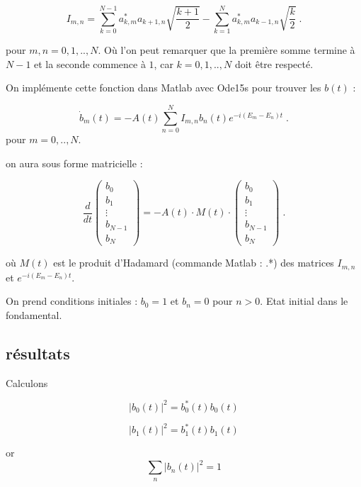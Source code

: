 \documentclass{report}
\begin{document}
\begin{equation}
I_{m,n} = \sum_{k=0}^{N-1} a_{k,m}^{\ast}  a_{k+1,n} \sqrt{\frac{k+1}{2}}- \sum_{k=1}^{N} a_{k,m}^{\ast}a_{k-1,n}\sqrt{\frac{k}{2}}\;.
\end{equation}

pour $m,n = 0,1,..,N$. Où l'on peut remarquer que la première somme termine à $N-1$ et la seconde commence à $1$, car $k =0,1,..,N$ doit être respecté.




On implémente cette fonction dans Matlab avec Ode15s pour trouver les $b(t)$ :

\begin{equation}
\dot{b}_{m}(t) = - A(t) \sum_{n=0}^{N}I_{m,n}b_{n}(t) e^{-i(E_{m}-E_{n})t}\;.
\end{equation}
pour $m=0,..,N$.

on aura sous forme matricielle :

\begin{equation}
\frac{d}{dt}
\begin{pmatrix}
 b_{0}\\ 
 b_{1}\\ 
 \vdots\\ 
 b_{N-1}\\ 
  b_{N}
\end{pmatrix} = -A(t) \cdot M(t) \cdot 
\begin{pmatrix}
 b_{0}\\ 
 b_{1}\\ 
 \vdots\\ 
 b_{N-1}\\ 
  b_{N}
\end{pmatrix}\;.
\end{equation}

où $M(t)$ est le produit d'Hadamard (commande Matlab : .*) des matrices $I_{m,n}$ et $e^{-i(E_{m}-E_{n})t}$. 

On prend conditions initiales : $b_{0}=1$ et $b_{n}=0$ pour $n > 0$. Etat initial dans le fondamental.


\subsection{résultats}

Calculons 

$$\left| b_{0}(t)\right|^2= b^\ast_0(t)b_0(t)$$

$$\left| b_{1}(t)\right|^2= b^\ast_1(t)b_1(t)$$

 
or
$$\sum_{n} \left| b_{n}(t)\right|^2 =1$$
\end{document}
